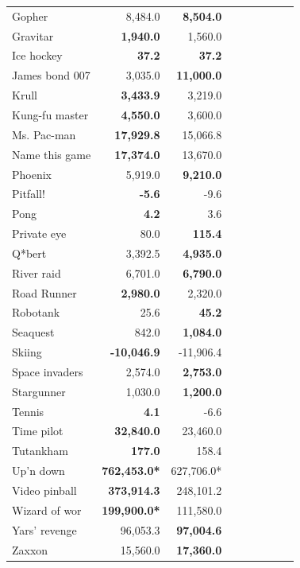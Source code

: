 \begin{table}[ht]
\begin{center}
\begin{small}
\begin{tabular}{lrrrrrrrl}
Gopher          & 8,484.0              & \textbf{8,504.0}     \\
Gravitar        & \textbf{1,940.0}     & 1,560.0              \\
Ice hockey      & \textbf{37.2}        & \textbf{37.2}        \\
James bond 007  & 3,035.0              & \textbf{11,000.0}    \\
Krull           & \textbf{3,433.9}     & 3,219.0              \\
Kung-fu master  & \textbf{4,550.0}     & 3,600.0              \\
Ms. Pac-man     & \textbf{17,929.8}    & 15,066.8             \\
Name this game  & \textbf{17,374.0}    & 13,670.0             \\
Phoenix         & 5,919.0              & \textbf{9,210.0}     \\
Pitfall!        & \textbf{-5.6}        & -9.6                 \\
Pong            & \textbf{4.2}         & 3.6                  \\
Private eye     & 80.0                 & \textbf{115.4}       \\
Q*bert          & 3,392.5              & \textbf{4,935.0}     \\
River raid      & 6,701.0              & \textbf{6,790.0}     \\
Road Runner     & \textbf{2,980.0}     & 2,320.0              \\
Robotank        & 25.6                 & \textbf{45.2}        \\
Seaquest        & 842.0                & \textbf{1,084.0}     \\
Skiing          & \textbf{-10,046.9}   & -11,906.4            \\
Space invaders  & 2,574.0              & \textbf{2,753.0}     \\
Stargunner      & 1,030.0              & \textbf{1,200.0}     \\
Tennis          & \textbf{4.1}         & -6.6                 \\
Time pilot      & \textbf{32,840.0}    & 23,460.0             \\
Tutankham       & \textbf{177.0}       & 158.4                \\
Up'n down       & \textbf{762,453.0*}   & 627,706.0*            \\
Video pinball   & \textbf{373,914.3}   & 248,101.2            \\
Wizard of wor   & \textbf{199,900.0*}   & 111,580.0            \\
Yars' revenge   & 96,053.3             & \textbf{97,004.6}    \\
Zaxxon          & 15,560.0             & \textbf{17,360.0}    \\
\midrule


\end{tabular}
\end{small}
\end{center}
\end{table}
